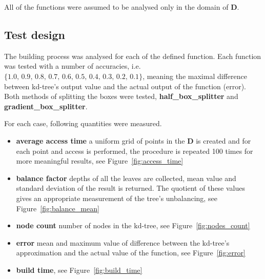 All of the functions were assumed to be analysed only in the domain of $\mathbf{D}$.

\subsection{Test design}

The building process was analysed for each of the defined function.
Each function was tested with a number of accuracies,
i.e. $\{1.0,\, 0.9,\, 0.8,\, 0.7,\, 0.6,\, 0.5,\, 0.4,\, 0.3,\, 0.2,\, 0.1\}$,
meaning the maximal difference between kd-tree's output value and the actual
output of the function (error).
Both methods of splitting the boxes were tested, \textbf{half\_box\_splitter}
and \textbf{gradient\_box\_splitter}.

For each case, following quantities were measured.
\begin{itemize}
    \item \textbf{average access time} a uniform grid of points in the
        $\mathbf{D}$ is created and for each point and access is performed, the
        procedure is repeated 100 times for more meaningful results, see Figure~\ref{fig:access_time}
    \item \textbf{balance factor} depths of all the leaves are collected, mean
        value and standard deviation of the result is returned. The quotient of
        these values gives an appropriate measurement of the tree's
        unbalancing, see Figure~\ref{fig:balance_mean}
    \item \textbf{node count} number of nodes in the kd-tree, see Figure~\ref{fig:nodes_count}
    \item \textbf{error} mean and maximum value of difference between the
        kd-tree's approximation and the actual value of the function, see Figure~\ref{fig:error}
    \item \textbf{build time}, see Figure~\ref{fig:build_time}
\end{itemize}



